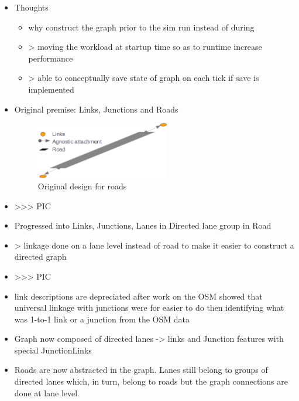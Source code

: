 \begin{itemize}
	\item Thoughts
	\begin{itemize}
		\item why construct the graph prior to the sim run instead of during	
		\item > moving the workload at startup time so as to runtime increase performance
		\item > able to conceptually save state of graph on each tick if save is implemented
	\end{itemize}
	\item Original premise: Links, Junctions and Roads

\begin{figure}
	\vspace{1.5em}
  	\caption{Original design for roads}
  	\label{fig:RoadsOriginal}
  	\centering
	\includegraphics[width=0.55\textwidth]{figs/graphConstruction/OriginalRoads.png}
  	\vspace{1.5em}
\end{figure}	
	
	\item >>> PIC
	\item Progressed into Links, Junctions, Lanes in Directed lane group in Road
	\item > linkage done on a lane level instead of road to make it easier to construct a directed graph
	\item >>> PIC
	\item link descriptions are depreciated after work on the OSM showed that universal linkage with junctions were for easier to do then identifying what was 1-to-1 link or a junction from the OSM data
	\item Graph now composed of directed lanes -> links and Junction features with special JunctionLinks
	\item Roads are now abstracted in the graph. Lanes still belong to groups of directed lanes which, in turn, belong to roads but the graph connections are done at lane level.
	

\end{itemize}
